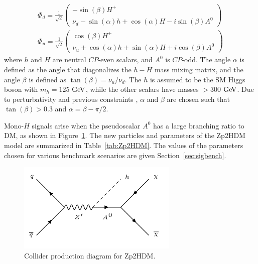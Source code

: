 \begin{equation}
\begin{split}
\Phi_d = \frac{1}{\sqrt{2}} \begin{pmatrix}-\sin(\beta) H^{+} \\ \nu_d - \sin(\alpha)h + \cos(\alpha)H - i\sin(\beta)A^0 \end{pmatrix} \\
\Phi_u = \frac{1}{\sqrt{2}} \begin{pmatrix} \cos(\beta)H^{+} \\  \nu_u + \cos(\alpha)h + \sin(\alpha)H + i\cos(\beta)A^0 \end{pmatrix}
\end{split}
\end{equation}
where $h$ and $H$ are neutral $CP$-even scalars, and $A^0$ is $CP$-odd. The angle $\alpha$ is defined as the angle that diagonalizes the $h-H$ mass mixing matrix, and the angle $\beta$ is defined as $\tan(\beta) = \nu_u / \nu_d$. The $h$ is assumed to be the SM Higgs boson with $m_h = 125$ $\mathrm{Ge\kern -0.1em V}$, while the other scalars have masses $> 300$ $\mathrm{Ge\kern -0.1em V}$. Due to perturbativity and previous constraints \cite{Craig:2013hca}, $\alpha$ and $\beta$ are chosen such that $\tan(\beta)>0.3$ and $\alpha = \beta - \pi/2$.

Mono-$H$ signals arise when the pseudoscalar $A^0$ has a large branching ratio to DM, as shown in Figure~\ref{fig:zp2hdmsig}. The new particles and parameters of the Zp2HDM model are summarized in Table~\ref{tab:Zp2HDM}. The values of the parameters chosen for various benchmark scenarios are given Section~\ref{sec:sigbench}.

\begin{figure}[tbh]
\centering
\includegraphics[width=3in]{figures/zp2hdmsig.png}
\caption{Collider production diagram for Zp2HDM.}
\label{fig:zp2hdmsig}
\end{figure}

